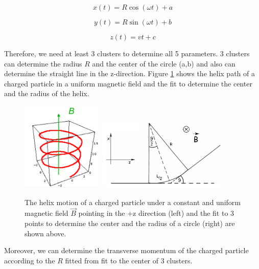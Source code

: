 \begin{equation}
x(t) = R \cos(\omega t) + a
\end{equation}

\begin{equation}
y(t) = R \sin(\omega t) + b
\end{equation}

\begin{equation}
z(t) = v t + c
\end{equation}

Therefore, we need at least 3 clusters to determine all 5 parameters. 3 clusters can determine the radius $R$ and the center of the circle (a,b) and also can determine the straight line in the z-direction. Figure \ref{HelixAndFit} shows the helix path of a charged particle in a uniform magnetic field and the fit to determine the center and the radius of the helix.


\begin{figure}[hbtp]
\begin{center}
\includegraphics[width=0.35\textwidth]{Figures/Chapter4/Helix.png}
\includegraphics[width=0.55\textwidth]{Figures/Chapter4/FitToCircle.png}
\caption{The helix motion of a charged particle under a constant and uniform magnetic field $\vec{B}$ pointing in the +z direction (left) and the fit to 3 points to determine the center and the radius of a circle (right) are shown above.}
\label{HelixAndFit}
\end{center}
\end{figure} 

Moreover, we can determine the transverse momentum of the charged particle according to the $R$ fitted from fit to the center of 3 clusters.

